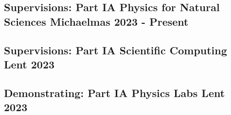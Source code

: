 \subsection{{Supervisions: Part IA Physics for Natural Sciences \hfill Michaelmas 2023 - Present}}
\subsection{{Supervisions: Part IA Scientific Computing \hfill Lent 2023}}
\subsection{{Demonstrating: Part IA Physics Labs \hfill Lent 2023}}